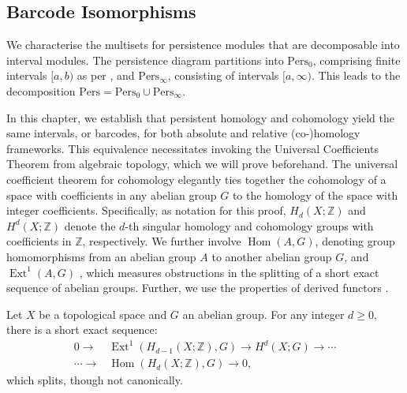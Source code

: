 \subsection{Barcode Isomorphisms}
\label{BarcodeIsomorphisms}
We characterise the multisets for persistence modules that are decomposable into
interval modules. The persistence diagram partitions into $\mathrm{Pers}_{0}$,
comprising finite intervals $[a, b)$ as per \cite[\S 2.3]{de2011dualities}, and $\mathrm{Pers}_{\infty}$, consisting of intervals $[a, \infty)$. This leads to the decomposition
$\mathrm{Pers}= \mathrm{Pers}_{0} \cup \mathrm{Pers}_{\infty}$.

In this chapter, we establish that persistent homology and cohomology yield the
same intervals, or barcodes, for both absolute and relative (co-)homology
frameworks. This equivalence necessitates invoking the Universal Coefficients Theorem
from algebraic topology, which we will prove beforehand. The universal coefficient
theorem for cohomology elegantly ties together the cohomology of a space with coefficients
in any abelian group $G$ to the homology of the space with integer coefficients. Specifically, as notation for this proof, $H_{d}(X;\mathbb{Z})$ and
$H^{d}(X;\mathbb{Z})$ denote the $d$-th singular homology and cohomology groups
with coefficients in $\mathbb{Z}$, respectively. We further involve
$\operatorname{Hom}(A, G)$, denoting group homomorphisms from an abelian group $A$ to another
abelian group $G$, and $\operatorname{Ext}^{1}(A, G)$ \cite[\S 3.1, p.195]{hatcher2005algebraic}, which measures obstructions
in the splitting of a short exact sequence of abelian groups. Further, we use the
properties of derived functors \cite[\S 2.7]{Weibel1994}.

\begin{theorem}{\cite[Theorem 3.2]{hatcher2005algebraic}}
\label{UniversalCoefficientsforCohomology}
Let $X$ be a topological space and $G$ an abelian group. For any integer $d \geq 0$, there is a short exact sequence:
\begin{align}
0 \rightarrow &\operatorname{Ext}^{1}(H_{d-1}(X;\mathbb{Z}), G) \rightarrow H^{d}(X; G) \rightarrow \cdots \nonumber\\
\cdots \rightarrow &\operatorname{Hom}(H_{d}(X;\mathbb{Z}), G) \rightarrow 0,
\end{align}
which splits, though not canonically.
\end{theorem}

